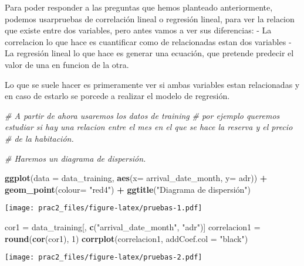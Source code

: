 \documentclass[]{article}
\newenvironment{Shaded}{\begin{snugshade}}{\end{snugshade}}
\newcommand{\CommentTok}[1]{\textcolor[rgb]{0.56,0.35,0.01}{\textit{#1}}}
\newcommand{\DataTypeTok}[1]{\textcolor[rgb]{0.13,0.29,0.53}{#1}}
\newcommand{\DecValTok}[1]{\textcolor[rgb]{0.00,0.00,0.81}{#1}}
\newcommand{\KeywordTok}[1]{\textcolor[rgb]{0.13,0.29,0.53}{\textbf{#1}}}
\newcommand{\NormalTok}[1]{#1}
\newcommand{\OperatorTok}[1]{\textcolor[rgb]{0.81,0.36,0.00}{\textbf{#1}}}
\newcommand{\StringTok}[1]{\textcolor[rgb]{0.31,0.60,0.02}{#1}}
\begin{document}
Para poder responder a las preguntas que hemos planteado anteriormente,
podemos usarpruebas de correlación lineal o regresión lineal, para ver
la relacion que existe entre dos variables, pero antes vamos a ver sus
diferencias: - La correlacion lo que hace es cuantificar como de
relacionadas estan dos variables - La regresión lineal lo que hace es
generar una ecuación, que pretende predecir el valor de una en funcion
de la otra.

Lo que se suele hacer es primeramente ver si ambas variables estan
relacionadas y en caso de estarlo se porcede a realizar el modelo de
regresión.

\begin{Shaded}
\begin{Highlighting}[]
\CommentTok{# A partir de ahora usaremos los datos de training}
\CommentTok{# por ejemplo queremos estudiar si hay una relacion entre el mes en el que se hace la reserva y el precio}
\CommentTok{# de la habitación.}

\CommentTok{# Haremos un diagrama de dispersión.}

\KeywordTok{ggplot}\NormalTok{(}\DataTypeTok{data =}\NormalTok{ data_training, }\KeywordTok{aes}\NormalTok{(}\DataTypeTok{x=}\NormalTok{  arrival_date_month, }\DataTypeTok{y=}\NormalTok{ adr)) }\OperatorTok{+}
\StringTok{  }\KeywordTok{geom_point}\NormalTok{(}\DataTypeTok{colour=} \StringTok{"red4"}\NormalTok{) }\OperatorTok{+}
\StringTok{  }\KeywordTok{ggtitle}\NormalTok{(}\StringTok{"Diagrama de dispersión")}
\end{Highlighting}
\end{Shaded}

\texttt{[image: prac2\_files/figure-latex/pruebas-1.pdf]}

\begin{Shaded}
\begin{Highlighting}[]
\NormalTok{cor1 =}\StringTok{ }\NormalTok{data_training[, }\KeywordTok{c}\NormalTok{(}\StringTok{"arrival_date_month"}\NormalTok{, }\StringTok{"adr"}\NormalTok{)]}
\NormalTok{correlacion1 =}\StringTok{ }\KeywordTok{round}\NormalTok{(}\KeywordTok{cor}\NormalTok{(cor1), }\DecValTok{1}\NormalTok{)}
\KeywordTok{corrplot}\NormalTok{(correlacion1, }\DataTypeTok{addCoef.col =} \StringTok{"black"}\NormalTok{)}
\end{Highlighting}
\end{Shaded}

\texttt{[image: prac2\_files/figure-latex/pruebas-2.pdf]}
\end{document}
